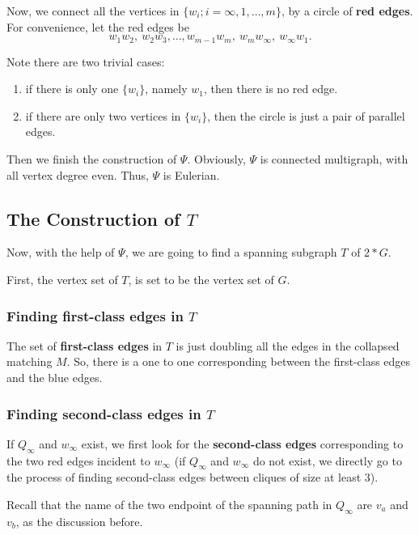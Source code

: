 \documentclass{amsart}
\begin{document}
Now, we connect all the vertices in $\{w_i;i=\infty,1,\ldots,m\}$, by a circle of {\bf red edges}. For convenience, let the red edges be $$w_1w_2,~w_2w_3,\ldots,w_{m-1}w_m,~w_mw_{\infty},~w_{\infty}w_1.$$

 Note there are two trivial cases:
\begin{enumerate}
\item if there is only one $\{w_i\}$, namely $w_1$, then there is no red edge.
\item if there are only two vertices in $\{w_i\}$, then the circle is just a pair of parallel edges.
\end{enumerate}

Then we finish the construction of $\Psi$. Obviously, $\Psi$ is connected multigraph, with all vertex degree even. Thus, $\Psi$ is Eulerian.







\subsection{The Construction of $T$}


Now, with the help of $\Psi$, we are going to find a spanning subgraph $T$ of $2*G$.

First, the vertex set of $T$, is set to be the vertex set of $G$.

\subsubsection{
Finding first-class edges in $T$}
The set of {\bf first-class edges} in $T$ is just doubling all the edges in the collapsed matching $M$. So, there is a one to one corresponding between the first-class edges and the blue edges.



\subsubsection{
Finding second-class edges in $T$}
If $Q_{\infty}$ and $w_{\infty}$ exist, we first look for the {\bf second-class edges} corresponding to the two red edges incident to $w_{\infty}$ (if $Q_{\infty}$ and $w_{\infty}$ do not exist, we directly go to the process of finding second-class edges between cliques of size at least 3).


Recall that the name of the two endpoint of the spanning path in $Q_{\infty}$ are $v_a$ and $v_b$, as the discussion before.
\end{document}
